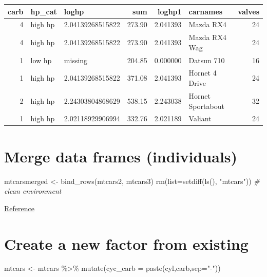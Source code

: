 \documentclass[
]{book}
\newenvironment{Shaded}{\begin{snugshade}}{\end{snugshade}}
\newcommand{\AttributeTok}[1]{\textcolor[rgb]{0.77,0.63,0.00}{#1}}
\newcommand{\CommentTok}[1]{\textcolor[rgb]{0.56,0.35,0.01}{\textit{#1}}}
\newcommand{\FunctionTok}[1]{\textcolor[rgb]{0.00,0.00,0.00}{#1}}
\newcommand{\NormalTok}[1]{#1}
\newcommand{\OtherTok}[1]{\textcolor[rgb]{0.56,0.35,0.01}{#1}}
\newcommand{\SpecialCharTok}[1]{\textcolor[rgb]{0.00,0.00,0.00}{#1}}
\newcommand{\StringTok}[1]{\textcolor[rgb]{0.31,0.60,0.02}{#1}}
\begin{document}
\begin{table}
\centering
\begin{tabular}{r|l|l|r|r|l|r}
\hline
carb & hp\_cat & loghp & sum & loghp1 & carnames & valves\\
\hline
4 & high hp & 2.04139268515822 & 273.90 & 2.041393 & Mazda RX4 & 24\\
\hline
4 & high hp & 2.04139268515822 & 273.90 & 2.041393 & Mazda RX4 Wag & 24\\
\hline
1 & low hp & missing & 204.85 & 0.000000 & Datsun 710 & 16\\
\hline
1 & high hp & 2.04139268515822 & 371.08 & 2.041393 & Hornet 4 Drive & 24\\
\hline
2 & high hp & 2.24303804868629 & 538.15 & 2.243038 & Hornet Sportabout & 32\\
\hline
1 & high hp & 2.02118929906994 & 332.76 & 2.021189 & Valiant & 24\\
\hline
\end{tabular}
\end{table}

\hypertarget{merge-data-frames-individuals}{%
\section{Merge data frames (individuals)}\label{merge-data-frames-individuals}}

\begin{Shaded}
\begin{Highlighting}[]
\NormalTok{mtcarsmerged }\OtherTok{\textless{}{-}} \FunctionTok{bind\_rows}\NormalTok{(mtcars2, mtcars3)}
\FunctionTok{rm}\NormalTok{(}\AttributeTok{list=}\FunctionTok{setdiff}\NormalTok{(}\FunctionTok{ls}\NormalTok{(), }\StringTok{"mtcars"}\NormalTok{)) }\CommentTok{\# clean environment}
\end{Highlighting}
\end{Shaded}

\href{https://dplyr.tidyverse.org/reference/bind.html}{Reference}

\hypertarget{create-a-new-factor-from-existing}{%
\section{Create a new factor from existing}\label{create-a-new-factor-from-existing}}

\begin{Shaded}
\begin{Highlighting}[]
\NormalTok{mtcars }\OtherTok{\textless{}{-}}\NormalTok{ mtcars }\SpecialCharTok{\%\textgreater{}\%} \FunctionTok{mutate}\NormalTok{(}\AttributeTok{cyc\_carb =} \FunctionTok{paste}\NormalTok{(cyl,carb,}\AttributeTok{sep=}\StringTok{"{-}"}\NormalTok{))}
\end{Highlighting}
\end{Shaded}
\end{document}
